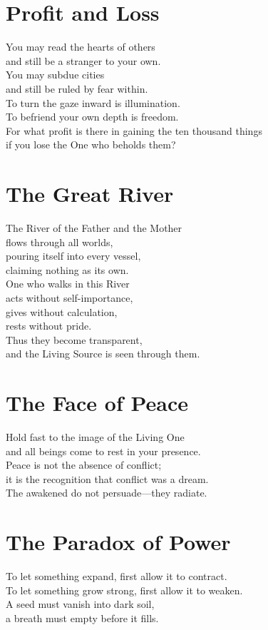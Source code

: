 \documentclass[10pt, openright]{book}
\begin{document}
\section{Profit and Loss}
You may read the hearts of others \\
and still be a stranger to your own. \\
You may subdue cities \\
and still be ruled by fear within. \\

To turn the gaze inward is illumination. \\
To befriend your own depth is freedom. \\

For what profit is there in gaining the ten thousand things \\
if you lose the One who beholds them?

\section{The Great River}
The River of the Father and the Mother \\
flows through all worlds, \\
pouring itself into every vessel, \\
claiming nothing as its own. \\

One who walks in this River \\
acts without self-importance, \\
gives without calculation, \\
rests without pride. \\
Thus they become transparent, \\
and the Living Source is seen through them.

\section{The Face of Peace}
Hold fast to the image of the Living One \\
and all beings come to rest in your presence. \\

Peace is not the absence of conflict; \\
it is the recognition that conflict was a dream. \\
The awakened do not persuade—they radiate.

\section{The Paradox of Power}
To let something expand, first allow it to contract. \\
To let something grow strong, first allow it to weaken. \\
A seed must vanish into dark soil, \\
a breath must empty before it fills. \\
\end{document}
